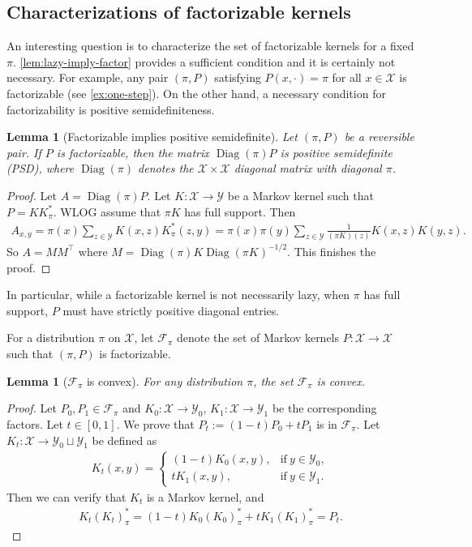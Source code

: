 \documentclass[11pt]{article}
\def\cF{\mathcal{F}}
\def\cX{\mathcal{X}}
\def\cY{\mathcal{Y}}
\DeclareMathOperator\Diag{\mathrm{Diag}}
\newtheorem{lemma}[theorem]{Lemma}
\theoremstyle{definition}
\begin{document}
\subsection{Characterizations of factorizable kernels}
An interesting question is to characterize the set of factorizable kernels for a fixed $\pi$.
\cref{lem:lazy-imply-factor} provides a sufficient condition and it is certainly not necessary.
For example, any pair $(\pi, P)$ satisfying $P(x,\cdot)=\pi$ for all $x\in \cX$ is factorizable (see \cref{ex:one-step}).
On the other hand, a necessary condition for factorizability is positive semidefiniteness.
\begin{lemma}[Factorizable implies positive semidefinite] \label{lem:factor-imply-psd}
  Let $(\pi, P)$ be a reversible pair.
  If $P$ is factorizable, then the matrix $\Diag(\pi) P$ is positive semidefinite (PSD), where $\Diag(\pi)$ denotes the $\cX\times \cX$ diagonal matrix with diagonal $\pi$.
\end{lemma}
\begin{proof}
  Let $A = \Diag(\pi) P$.
  Let $K: \cX \to \cY$ be a Markov kernel such that $P = KK_\pi^*$.
  WLOG assume that $\pi K$ has full support.
  Then
  \begin{align}
    A_{x,y} = \pi(x) \sum_{z\in \cY} K(x,z) K_\pi^*(z,y)
    = \pi(x) \pi(y) \sum_{z\in \cY} \frac 1{(\pi K)(z)} K(x,z) K(y,z).
  \end{align}
  So $A = M M^\top$ where $M = \Diag(\pi) K \Diag(\pi K)^{-1/2}$.
  This finishes the proof.
\end{proof}
In particular, while a factorizable kernel is not necessarily lazy, when $\pi$ has full support, $P$ must have strictly positive diagonal entries.

For a distribution $\pi$ on $\cX$, let $\cF_\pi$ denote the set of Markov kernels $P: \cX \to \cX$ such that $(\pi, P)$ is factorizable.
\begin{lemma}[$\cF_\pi$ is convex] \label{lem:factor-is-convex}
  For any distribution $\pi$, the set $\cF_\pi$ is convex.
\end{lemma}
\begin{proof}
  Let $P_0, P_1\in \cF_\pi$ and $K_0: \cX\to \cY_0$, $K_1: \cX\to \cY_1$ be the corresponding factors.
  Let $t\in [0, 1]$. We prove that $P_t := (1-t) P_0 + t P_1$ is in $\cF_\pi$.
  Let $K_t: \cX \to \cY_0 \sqcup \cY_1$ be defined as
  \begin{align}
    K_t(x,y) = \left\{
      \begin{array}{ll}
        (1-t) K_0(x, y), & \text{if}~y\in \cY_0,\\
        t K_1(x, y), & \text{if}~y\in \cY_1.
      \end{array}
    \right.
  \end{align}
  Then we can verify that $K_t$ is a Markov kernel, and
  \begin{align}
    K_t (K_t)_\pi^* = (1-t) K_0 (K_0)_\pi^* + t K_1 (K_1)_\pi^* = P_t.
  \end{align}
\end{proof}
\end{document}
